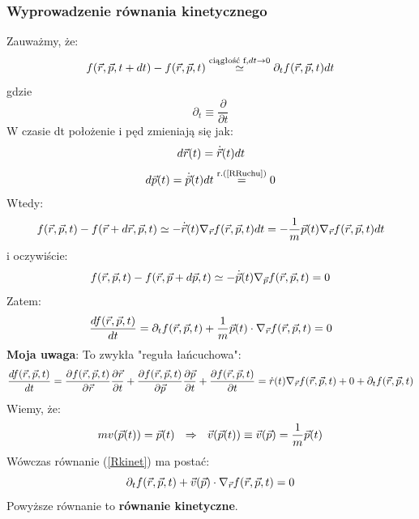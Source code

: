 \subsubsection{Wyprowadzenie równania kinetycznego}
Zauważmy, że:
\begin{equation}f(\vec{r},\vec{p},t+dt)-f(\vec{r},\vec{p},t) \stackrel{\text{ciągłość f}, dt\rightarrow 0}{\simeq}\partial_tf(\vec{r},\vec{p},t) dt\end{equation}
gdzie
\begin{equation}\partial_t\equiv \frac{\partial}{\partial t}\end{equation}
W czasie dt położenie i pęd zmieniają się jak:
\begin{equation}d\vec{r}(t)=\dot{\vec{r}}(t)dt \end{equation}
\begin{equation} d\vec{p}(t)=\dot{\vec{p}}(t)dt \stackrel{\text{r.(\ref{RRuchu})}}{=}0\end{equation}
Wtedy:
\begin{equation}f(\vec{r},\vec{p},t)-f(\vec{r}+d\vec{r},\vec{p},t)\simeq -\dot{\vec{r}}(t)\nabla_{\vec{r}}f(\vec{r},\vec{p},t) dt=-\frac{1}{m}\vec{p}(t)\nabla_{\vec{r}}f(\vec{r},\vec{p},t) dt\end{equation}
i oczywiście:
\begin{equation}f(\vec{r},\vec{p},t)-f(\vec{r},\vec{p}+d\vec{p},t)\simeq -\dot{\vec{p}}(t)\nabla_{\vec{p}}f(\vec{r},\vec{p},t)=0 \end{equation}
Zatem:
\begin{equation}\frac{df(\vec{r},\vec{p},t)}{dt}=\partial_tf(\vec{r},\vec{p},t)+\frac{1}{m}\vec{p}(t)\cdot\nabla_{\vec{r}}f(\vec{r},\vec{p},t)=0 \label{Rkinet}\end{equation} 
\textbf{Moja uwaga}: To zwykła "reguła łańcuchowa":
\begin{equation} \frac{df(\vec{r},\vec{p},t)}{dt}=\frac{\partial f(\vec{r},\vec{p},t)}{\partial\vec{r}}\frac{\partial\vec{r}}{\partial t}+\frac{\partial f(\vec{r},\vec{p},t)}{\partial\vec{p}}\frac{\partial\vec{p}}{\partial t}+\frac{\partial f(\vec{r},\vec{p},t)}{\partial t}=\dot{r}(t)\nabla_{\vec{r}}f(\vec{r},\vec{p},t)+0+\partial_tf(\vec{r},\vec{p},t)\end{equation}
Wiemy, że:
\begin{equation}mv(\vec{p}(t))=\vec{p}(t)~~ \Rightarrow ~~\vec{v}(\vec{p}(t))\equiv\vec{v}(\vec{p})=\frac{1}{m}\vec{p}(t)\end{equation}
Wówczas równanie (\ref{Rkinet}) ma postać:
\begin{equation}\partial_tf(\vec{r},\vec{p},t)+\vec{v}(\vec{p})\cdot\nabla_{\vec{r}}f(\vec{r},\vec{p},t)=0\label{Rkinet2}\end{equation}
Powyższe równanie to \textbf{równanie kinetyczne}.
